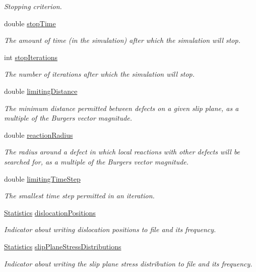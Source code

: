 \begin{DoxyCompactItemize}
\begin{DoxyCompactList}\small\item\em \-Stopping criterion. \end{DoxyCompactList}\item 
double \hyperlink{classParameter_a2a91bde3ec5b05c0ea30035e1d3562d1}{stop\-Time}
\begin{DoxyCompactList}\small\item\em \-The amount of time (in the simulation) after which the simulation will stop. \end{DoxyCompactList}\item 
int \hyperlink{classParameter_a41c818324af9b9b77902e68e9db79b2f}{stop\-Iterations}
\begin{DoxyCompactList}\small\item\em \-The number of iterations after which the simulation will stop. \end{DoxyCompactList}\item 
double \hyperlink{classParameter_a455283e72194ffb9f457a0d0ae86c582}{limiting\-Distance}
\begin{DoxyCompactList}\small\item\em \-The minimum distance permitted between defects on a given slip plane, as a multiple of the \-Burgers vector magnitude. \end{DoxyCompactList}\item 
double \hyperlink{classParameter_ac1e7cdb4673a7578b783fb0a71bb5722}{reaction\-Radius}
\begin{DoxyCompactList}\small\item\em \-The radius around a defect in which local reactions with other defects will be searched for, as a multiple of the \-Burgers vector magnitude. \end{DoxyCompactList}\item 
double \hyperlink{classParameter_a898b2121be4317971d62f4c103674173}{limiting\-Time\-Step}
\begin{DoxyCompactList}\small\item\em \-The smallest time step permitted in an iteration. \end{DoxyCompactList}\item 
\hyperlink{classStatistics}{\-Statistics} \hyperlink{classParameter_a5ed36460146364585c875d030289a4cc}{dislocation\-Positions}
\begin{DoxyCompactList}\small\item\em \-Indicator about writing dislocation positions to file and its frequency. \end{DoxyCompactList}\item 
\hyperlink{classStatistics}{\-Statistics} \hyperlink{classParameter_ad044e621f170fac3b3f743db5a19f817}{slip\-Plane\-Stress\-Distributions}
\begin{DoxyCompactList}\small\item\em \-Indicator about writing the slip plane stress distribution to file and its frequency. \end{DoxyCompactList}\end{DoxyCompactItemize}


